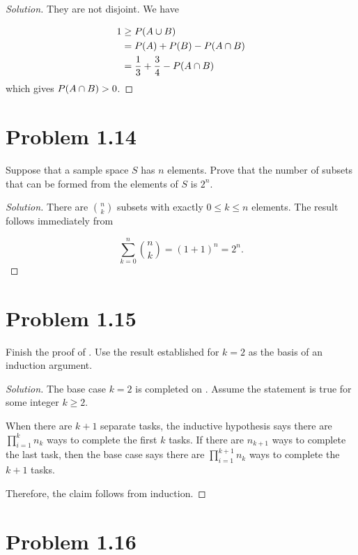 \documentclass[12pt,letterpaper,reqno]{amsart}
\numberwithin{equation}{subsection}
\begin{document}
\begin{proof}[Solution]
They are not disjoint. We have

\begin{align*}
    1 &\geq {P}\! \left( {A \cup B} \right) \\
      &= {P}\! \left( {A} \right) + {P}\! \left( {B} \right) - {P}\! \left( {A \cap B} \right) \\
      &= \frac{1}{3} + \frac{3}{4} - {P}\! \left( {A \cap B} \right)
\end{align*}
which gives ${P}\! \left( {A \cap B} \right) > 0$.
\end{proof}

\newpage
\section{Problem 1.14}

Suppose that a sample space $S$ has $n$ elements. Prove that the number of subsets that can be formed from the elements of $S$ is $2^n$.

\begin{proof}[Solution]
There are $\binom{n}{k}$ subsets with exactly $0 \leq k \leq n$ elements. The result follows immediately from

\[ \sum_{k=0}^n \binom{n}{k} = (1+1)^n = 2^n. \]
\end{proof}

\newpage
\section{Problem 1.15}

Finish the proof of \cite[Theorem 1.2.14 on page 13]{Berger-Casella}. Use the result established for $k = 2$ as the basis of an induction argument.

\begin{proof}[Solution] The base case $k = 2$ is completed on \cite[page 14]{Berger-Casella}. Assume the statement is true for some integer $k \geq 2$.

When there are $ k + 1$ separate tasks, the inductive hypothesis says there are $\prod_{i=1}^k n_k$ ways to complete the first $k$ tasks. If there are $n_{k+1}$ ways to complete the last task, then the base case says there are $\prod_{i=1}^{k+1} n_k$ ways to complete the $k+1$ tasks.

Therefore, the claim follows from induction.
\end{proof}

\newpage
\section{Problem 1.16}
\end{document}
